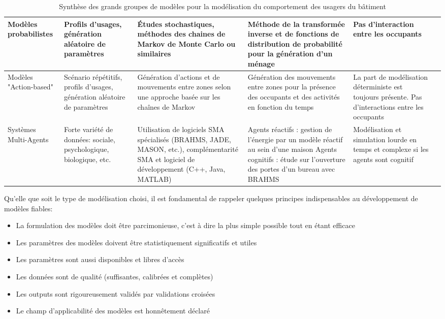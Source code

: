 \begin{landscape}
\begin{table}
\begin{tabular}{|p{4.5cm}||p{4.5cm}|p{4.5cm}|p{4.5cm}|p{4.5cm}|p{4.5cm}|}
\hline Modèles probabilistes & Profils d'usages, \newline génération aléatoire de paramètres & Études stochastiques, \newline méthodes des chaines de Markov de Monte Carlo ou similaires & \cite{Vorger-14} Méthode de la transformée inverse et de fonctions de distribution de probabilité pour la génération d'un ménage & Pas d'interaction entre les occupants \\
\hline Modèles "Action-based" & Scénario répétitifs, \newline profils d'usages, \newline génération aléatoire de paramètres & Génération d'actions et de mouvements entre zones selon une approche basée sur les chaînes de Markov & \cite{Annex-53-1} Génération des mouvements entre zones pour la présence des occupants et des activités en fonction du temps & La part de modélisation déterministe est toujours présente. Pas d'interactions entre les occupants \\
\hline Systèmes Multi-Agents & Forte variété de données: sociale, psychologique, biologique, etc. & Utilisation de logiciels SMA spécialisés (BRAHMS, JADE, MASON, etc.), \newline complémentarité SMA et logiciel de développement (C++, Java, MATLAB) & Agents réactifs \cite{Le-10}: gestion de l'énergie par un modèle réactif au sein d'une maison \newline Agents cognitifs \cite{Kashif-11}\cite{Tijani-14}: étude sur l'ouverture des portes d'un bureau avec BRAHMS & Modélisation et simulation lourde en temps et complexe si les agents sont cognitif \\
\hline 
\end{tabular}
\caption{Synthèse des grands groupes de modèles pour la modélisation du comportement des usagers du bâtiment}
\label{synthese modeles}
\end{table}
\end{landscape}

Qu'elle que soit le type de modélisation choisi, il est fondamental de rappeler quelques principes indispensables au développement de modèles fiables:
\begin{itemize}
\item La formulation des modèles doit être parcimonieuse, c'est à dire la plus simple possible tout en étant efficace
\item Les paramètres des modèles doivent être statistiquement significatifs et utiles
\item Les paramètres sont aussi disponibles et libres d'accès
\item Les données sont de qualité (suffisantes, calibrées et complètes)
\item Les outputs sont rigoureusement validés par validations croisées
\item Le champ d'applicabilité des modèles est honnêtement déclaré
\end{itemize}

